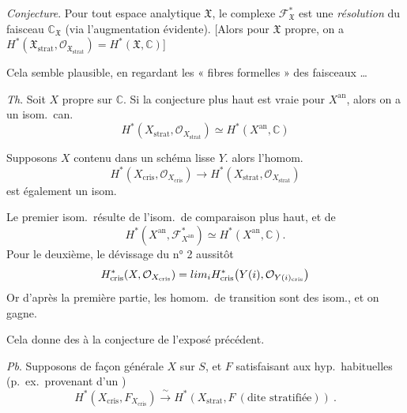 \documentclass[11pt,a4paper]{article}
\begin{document}
\emph{Conjecture}. Pour tout espace analytique $\mathfrak{X}$, le complexe
$\mathcal{F}^{*}_{\mathfrak{X}}$ est une \emph{résolution} du faisceau
$\mathbb{C}_{\mathfrak{X}}$ (via l'augmentation évidente).
[Alors pour $\mathfrak{X}$ propre, on a
$H^{*}(\mathfrak{X}_{\mathrm{strat}}, \mathcal{O}_{\mathfrak{X}_{\mathrm{strat}}})
= H^{*}(\mathfrak{X}, \mathbb{C})$]

\struck{\ill{}}
Cela semble plausible, en regardant les « fibres formelles » des
faisceaux \ldots

\emph{Th}. Soit $X$ propre sur $\mathbb{C}$. Si la conjecture plus haut
est vraie pour $X^{\mathrm{an}}$, alors on a un isom.\ can.
\[
  H^{*}(X_{\mathrm{strat}}, \mathcal{O}_{X_{\mathrm{strat}}})
  \simeq H^{*}(X^{\mathrm{an}}, \mathbb{C})
\]


Supposons $X$ contenu dans un schéma lisse $Y$.
 alors
l'homom.\ \struck{\ill{} \ill{}}
\[
  H^{*}(X_{\mathrm{cris}}, \mathcal{O}_{X_{\mathrm{cris}}}) \longrightarrow
  H^{*}(X_{\mathrm{strat}}, \mathcal{O}_{X_{\mathrm{strat}}})
\]
est également un isom.

Le premier isom.\ résulte de l'isom.\ de comparaison plus haut, et de
\[
  H^{*}(X^{\mathrm{an}}, \mathcal{F}^{*}_{X^{\mathrm{an}}})
  \simeq H^{*}(X^{\mathrm{an}}, \mathbb{C}) .
\]
Pour le deuxième, le dévissage du n° 2 \ill{} aussitôt
\[
  H^{*}_{\mathrm{cris}}(X, \mathcal{O}_{X_{\mathrm{cris}}})
  = \varprojlim_{i} H^{*}_{\mathrm{cris}}\bigl(Y(i),
  \mathcal{O}_{Y(i)_{\mathrm{cris}}}\bigr)
\]
Or d'après la première partie, les homom.\ de transition sont des isom.,
et on gagne.

Cela donne \ill{} des  à la conjecture de l'exposé
précédent.

\emph{Pb}. Supposons de façon générale $X$ \emph{}
 sur $S$, et $F$ 
satisfaisant aux hyp.\ habituelles (p.\ ex.\ provenant d'un
 \ill{} ) 
\ill{} \ill{}
\[
  H^{*}(X_{\mathrm{cris}}, F_{X_{\mathrm{cris}}}) \xrightarrow{\ \sim\ }
  H^{*}(X_{\mathrm{strat}}, F\ (\text{dite stratifiée}))\ .
\]
\end{document}

